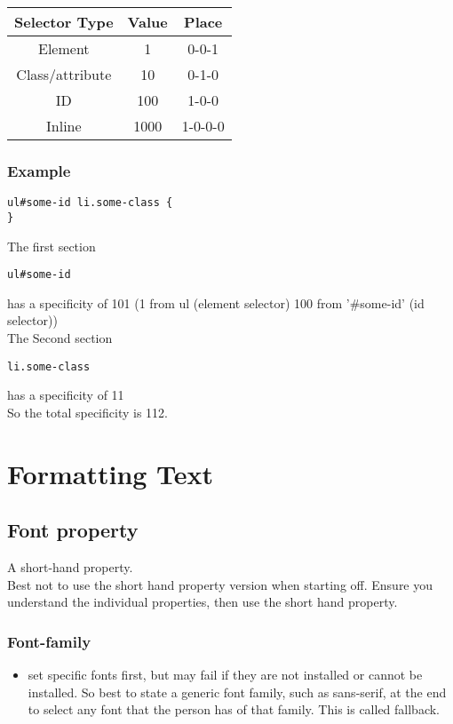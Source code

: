 \documentclass[]{article}
\newcommand{\<}{\guilsinglleft}
\renewcommand{\>}{\guilsinglright}
\begin{document}
\begin{center}
	\begin{tabular}{| c | c | c |} 
		\hline
		Selector Type  & Value & Place  \\ [0.5ex] 
		\hline
		Element  & 1 & 0-0-1 \\ 
		
		Class/attribute &  10 & 0-1-0 \\
		
		ID & 100 & 1-0-0 \\
		
		Inline & 1000 &1-0-0-0 \\[1ex] 
		\hline
	\end{tabular}
\end{center}

\subsubsection{Example}
\begin{lstlisting}
ul#some-id li.some-class {
}
\end{lstlisting}
The first section
\begin{lstlisting}
ul#some-id
\end{lstlisting}
has a specificity of 101 (1 from ul (element selector) 100 from '\#some-id' (id selector)) 
\\
The Second section
\begin{lstlisting}
li.some-class
\end{lstlisting}
has a specificity of 11
\\
So the total specificity is 112.

\section{Formatting Text}

\subsection{Font property}
A short-hand property.
\\
Best not to use the short hand property version when starting off.  Ensure you understand the individual properties, then use the short hand property.

\subsubsection{Font-family}
\begin{itemize}
	\item set specific fonts first, but may fail if they are not installed or cannot be installed.  So best to state a generic font family, such as sans-serif, at the end to select any font that the person has of that family.  This is called fallback.
\end{itemize}
\end{document}
